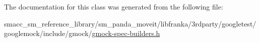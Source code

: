 The documentation for this class was generated from the following file\+:\begin{DoxyCompactItemize}
\item 
smacc\+\_\+sm\+\_\+reference\+\_\+library/sm\+\_\+panda\+\_\+moveit/libfranka/3rdparty/googletest/googlemock/include/gmock/\hyperlink{gmock-spec-builders_8h}{gmock-\/spec-\/builders.\+h}\end{DoxyCompactItemize}
